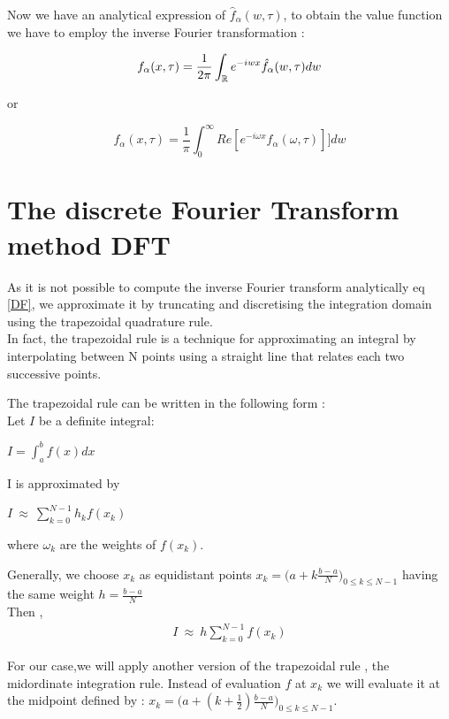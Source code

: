 \documentclass[12pt]{report}
\begin{document}
Now we have an analytical expression of $\hat{f}_{\alpha}(w,\tau)$, to obtain the value function we have to employ the inverse Fourier transformation :

\begin{equation}
f_{\alpha}(x,\tau)=\frac{1}{2\pi}\int_{\mathbb{R}} e^{-iwx}\hat{f}_{\alpha}(w,\tau) dw
\end{equation}

or 

\begin{equation}
f_{\alpha}(x,\tau)=\frac{1}{\pi}\int_{0}^{\infty} Re[e^{-i \omega x}\hat{f}_{\alpha}(\omega,\tau)] ]dw
\label{DF}
\end{equation}

\section{The discrete Fourier Transform method DFT}

As it is not possible to compute the inverse Fourier transform analytically eq \eqref{DF}, we
approximate it by truncating and discretising the integration domain using the trapezoidal quadrature rule.\\ 

In fact, the trapezoidal rule is a technique for approximating an integral by interpolating between N  points using a straight line that relates each two successive points. 

The trapezoidal rule can be written in the following form :\\
  
Let $I$ be a definite integral:
\begin{center}
$I=\int_{a}^{b} f(x) dx$
\end{center}  
I is approximated by 
\begin{center}
$I ~\approx ~ \sum \limits_{k=0}^{N-1} h_k f(x_k)$
\end{center}

where $\omega_k$ are the weights of $f(x_k).$ 


Generally, we choose $x_k$ as equidistant points $x_k= \big ( a+k \frac{b-a}{N}\big ) _{0 \le k \le N-1}$ having the same weight $h=\frac{b-a}{N}$\\
Then ,
\begin{gather}
I ~\approx ~ h \sum \limits_{k=0}^{N-1} f(x_k)
\label{approx}
\end{gather}

For our case,we will apply another version of the trapezoidal rule , the midordinate integration rule. Instead of evaluation $f$ at $x_k$ we will evaluate it at the midpoint defined by :
 $ x_k= \big ( a+(k+\frac{1}{2}) \frac{b-a}{N}\big ) _{0 \le k \le N-1}$.\\
 
\end{document}
